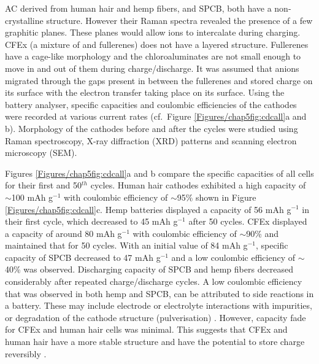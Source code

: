 AC derived from human hair and hemp fibers, and SPCB, both have a non-crystalline structure. However their Raman spectra revealed the presence of a few graphitic planes. These planes would allow  ions to intercalate during charging. CFEx (a mixture of  and  fullerenes) does not have a layered structure. Fullerenes have a cage-like morphology and the chloroaluminates are not small enough to move in and out of them during charge/discharge. It was assumed that  anions migrated through the gaps present in between the fullerenes and stored charge on its surface with the electron transfer taking place on its surface. Using the battery analyser, specific capacities and coulombic efficiencies of the cathodes were recorded at various current rates (cf.\ Figure \ref{Figures/chap5fig:cdcall}a and b). Morphology of the cathodes before and after the cycles were studied using Raman spectroscopy, X-ray diffraction (XRD) patterns and scanning electron microscopy (SEM).

Figures \ref{Figures/chap5fig:cdcall}a and b compare the specific capacities of all cells for their first and 50$^{th}$ cycles. Human hair cathodes exhibited a high capacity of $\sim$100 mAh g$^{-1}$ with coulombic efficiency of $\sim$95$\%$ shown in Figure \ref{Figures/chap5fig:cdcall}c. Hemp batteries displayed a capacity of 56 mAh g$^{-1}$ in their first cycle, which decreased to 45 mAh g$^{-1}$ after 50 cycles. CFEx displayed a capacity of around 80 mAh g$^{-1}$ with coulombic efficiency of $\sim$90\% and maintained that for 50 cycles. With an initial value of 84 mAh g$^{-1}$, specific capacity of SPCB decreased to 47 mAh g$^{-1}$ and a low coulombic efficiency of $\sim$40\% was observed. Discharging capacity of SPCB and hemp fibers decreased considerably after repeated charge/discharge cycles. A low coulombic efficiency that was observed in both hemp and SPCB, can be attributed to side reactions in a battery. These may include electrode or electrolyte interactions with impurities, or degradation of the cathode structure (pulverisation) \cite{gyenes_understanding_2015-1}. However, capacity fade for CFEx and human hair cells was minimal. This suggests that CFEx and human hair have a more stable structure and have the potential to store charge reversibly \cite{pramanick_human_2016}.\\


